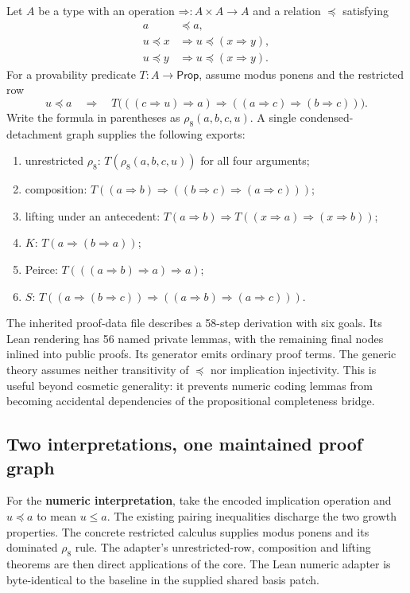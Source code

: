 \documentclass[11pt]{article}
\newcommand{\Imp}{\mathbin{\Rightarrow}}
\begin{document}
Let $A$ be a type with an operation $\Imp:A\times A\to A$ and a relation
$\preceq$ satisfying
\begin{align*}
 a&\preceq a,\\
 u\preceq x&\Longrightarrow u\preceq(x\Imp y),\\
 u\preceq y&\Longrightarrow u\preceq(x\Imp y).
\end{align*}
For a provability predicate $T:A\to\mathsf{Prop}$, assume modus ponens and the
restricted row
\[
 u\preceq a\quad\Longrightarrow\quad
 T\bigl(((c\Imp u)\Imp a)\Imp((a\Imp c)\Imp(b\Imp c))\bigr).
\]
Write the formula in parentheses as $\rho_8(a,b,c,u)$. A single
condensed-detachment graph supplies the following exports:
\begin{enumerate}
\item unrestricted $\rho_8$: $T(\rho_8(a,b,c,u))$ for all four arguments;
\item composition: $T((a\Imp b)\Imp((b\Imp c)\Imp(a\Imp c)))$;
\item lifting under an antecedent: $T(a\Imp b)\Rightarrow
      T((x\Imp a)\Imp(x\Imp b))$;
\item $K$: $T(a\Imp(b\Imp a))$;
\item Peirce: $T(((a\Imp b)\Imp a)\Imp a)$;
\item $S$: $T((a\Imp(b\Imp c))\Imp((a\Imp b)\Imp(a\Imp c)))$.
\end{enumerate}

The inherited proof-data file describes a 58-step derivation with six goals.
Its Lean rendering has 56 named private lemmas, with the remaining final nodes
inlined into public proofs. Its generator emits ordinary proof terms. The generic theory assumes neither
transitivity of $\preceq$ nor implication injectivity. This is useful beyond
cosmetic generality: it prevents numeric coding lemmas from becoming accidental
dependencies of the propositional completeness bridge.

\subsection{Two interpretations, one maintained proof graph}

For the \textbf{numeric interpretation}, take the encoded implication operation
and $u\preceq a$ to mean $u\leq a$. The existing pairing inequalities discharge
the two growth properties. The concrete restricted calculus supplies modus
ponens and its dominated $\rho_8$ rule. The adapter's unrestricted-row,
composition and lifting theorems are then direct applications of the core. The
Lean numeric adapter is byte-identical to the baseline in the supplied shared
basis patch.
\end{document}
